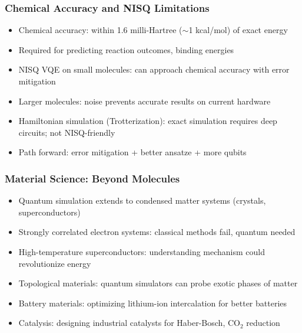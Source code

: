 \begin{frame}[fragile]\frametitle{Chemical Accuracy and NISQ Limitations}
\begin{itemize}
\item Chemical accuracy: within 1.6 milli-Hartree ($\sim$1 kcal/mol) of exact energy
\item Required for predicting reaction outcomes, binding energies
\item NISQ VQE on small molecules: can approach chemical accuracy with error mitigation
\item Larger molecules: noise prevents accurate results on current hardware
\item Hamiltonian simulation (Trotterization): exact simulation requires deep circuits; not NISQ-friendly
\item Path forward: error mitigation + better ansatze + more qubits
\end{itemize}
\end{frame}

\begin{frame}[fragile]\frametitle{Material Science: Beyond Molecules}
\begin{itemize}
\item Quantum simulation extends to condensed matter systems (crystals, superconductors)
\item Strongly correlated electron systems: classical methods fail, quantum needed
\item High-temperature superconductors: understanding mechanism could revolutionize energy
\item Topological materials: quantum simulators can probe exotic phases of matter
\item Battery materials: optimizing lithium-ion intercalation for better batteries
\item Catalysis: designing industrial catalysts for Haber-Bosch, CO$_2$ reduction
\end{itemize}
\end{frame}

